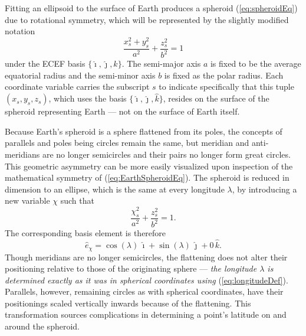\documentclass[11pt,dvipsnames]{thesis}
\begin{document}
Fitting an ellipsoid to the surface of Earth produces a spheroid (\ref{eq:spheroidEq}) due to rotational symmetry, which will be represented by the slightly modified notation
\begin{equation}
\frac{x_s^2 + y_s^2}{a^2} + \frac{z_s^2}{b^2} = 1 \label{eq:EarthSpheroidEq}
\end{equation}
under the ECEF basis $\{\hat{\imath}, \hat{\jmath}, \hat{k}\}$. The semi-major axis $a$ is fixed to be the average equatorial radius and the semi-minor axis $b$ is fixed as the polar radius.
Each coordinate variable carries the subscript $s$ to indicate specifically that this tuple $(x_s, y_s, z_s)$, which uses the basis $\{\hat{\imath}, \hat{\jmath}, \hat{k}\}$, resides on the surface of the spheroid representing Earth --- not on the surface of Earth itself.

Because Earth's spheroid is a sphere flattened from its poles, the concepts of parallels and poles being circles remain the same, but meridian and anti-meridians are no longer semicircles and their pairs no longer form great circles.
This geometric asymmetry can be more easily visualized upon inspection of the mathematical symmetry of (\ref{eq:EarthSpheroidEq}). The spheroid is reduced in dimension to an ellipse, which is the same at every longitude $\lambda$, by introducing a new variable $\chi$ such that
\begin{equation}
\frac{\chi_s^2}{a^2} + \frac{z_s^2}{b^2} = 1. \label{eq:EarthEllipseEq}
\end{equation}
The corresponding basis element is therefore
\begin{equation}
\hat{e}_{\chi} = \cos(\lambda)\,\hat{\imath} + \sin(\lambda)\,\hat{\jmath} + 0\,\hat{k}.
\end{equation}
Though meridians are no longer semicircles, the flattening does not alter their positioning relative to those of the originating sphere --- \textit{the longitude $\lambda$ is determined exactly as it was in spherical coordinates using }(\ref{eq:longitudeDef}).
Parallels, however, remaining circles as with spherical coordinates, have their positionings scaled vertically inwards because of the flattening. This transformation sources complications in determining a point's latitude on and around the spheroid.
\end{document}
